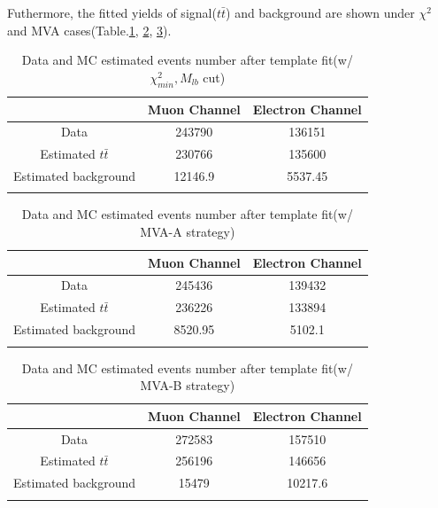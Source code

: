 		\FloatBarrier

		Futhermore, the fitted yields of signal($t\bar{t}$) and background are shown under $\chi^2$ and MVA cases(Table.\ref{BkgEst:tb:DataMC_est_chi2}, \ref{BkgEst:tb:DataMC_est_MVAA}, \ref{BkgEst:tb:DataMC_est_MVAB}).

		\begin{center}
		\begin{longtable}[H]{ c c c }
		\caption{Data and MC estimated events number after template fit(w/ $\chi^2_{min}, M_{lb}$ cut)} \\
		\hline
		 & Muon Channel & Electron Channel \\ 
		\hline
		 Data & 243790 & 136151 \\
		\hline
		 Estimated $t\bar{t}$ & 230766 & 135600 \\
		 Estimated background & 12146.9 & 5537.45 \\
		\hline
		\label{BkgEst:tb:DataMC_est_chi2}
		\end{longtable}
		\end{center}
		\FloatBarrier

		\begin{center}
		\begin{longtable}[H]{ c c c }
		\caption{Data and MC estimated events number after template fit(w/ MVA-A strategy)} \\
		\hline
		 & Muon Channel & Electron Channel \\ 
		\hline
		 Data & 245436 & 139432 \\
		\hline
		 Estimated $t\bar{t}$ & 236226 & 133894  \\
		 Estimated background & 8520.95 & 5102.1 \\
		\hline
		\label{BkgEst:tb:DataMC_est_MVAA}
		\end{longtable}
		\end{center}
		\FloatBarrier

		\begin{center}
		\begin{longtable}[H]{ c c c }
		\caption{Data and MC estimated events number after template fit(w/ MVA-B strategy)} \\
		\hline
		 & Muon Channel & Electron Channel \\ 
		\hline
		 Data & 272583 & 157510 \\
		\hline
		 Estimated $t\bar{t}$ & 256196 & 146656 \\
		 Estimated background & 15479 & 10217.6 \\
		\hline
		\label{BkgEst:tb:DataMC_est_MVAB}
		\end{longtable}
		\end{center}
		\FloatBarrier

